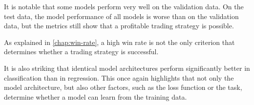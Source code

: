 \noindent
It is notable that some models perform very well on the validation data.
On the test data, the model performance of all models is worse than on the validation data, but the metrics still show that a profitable trading strategy is possible.

As explained in \autoref{chap:win-rate}, a high win rate is not the only criterion that determines whether a trading strategy is successful.

It is also striking that identical model architectures perform significantly better in classification than in regression.
This once again highlights that not only the model architecture, but also other factors, such as the loss function or the task, determine whether a model can learn from the training data.